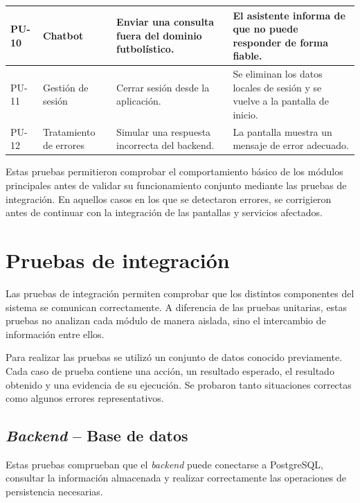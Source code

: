 \begin{table}[H]
\begin{tabular}{|l|p{3cm}|p{5cm}|p{4cm}|}
PU-10 & Chatbot & Enviar una consulta fuera del dominio futbolístico. & El asistente informa de que no puede responder de forma fiable. \\ \hline

PU-11 & Gestión de sesión & Cerrar sesión desde la aplicación. & Se eliminan los datos locales de sesión y se vuelve a la pantalla de inicio. \\ \hline

PU-12 & Tratamiento de errores & Simular una respuesta incorrecta del backend. & La pantalla muestra un mensaje de error adecuado. \\ \hline

\end{tabular}
\end{table}

Estas pruebas permitieron comprobar el comportamiento básico de los módulos principales antes de validar su funcionamiento conjunto mediante las pruebas de integración. En aquellos casos en los que se detectaron errores, se corrigieron antes de continuar con la integración de las pantallas y servicios afectados.

\section{Pruebas de integración}

Las pruebas de integración permiten comprobar que los distintos componentes del
sistema se comunican correctamente. A diferencia de las pruebas unitarias, estas
pruebas no analizan cada módulo de manera aislada, sino el intercambio de
información entre ellos.

Para realizar las pruebas se utilizó un conjunto de datos conocido previamente.
Cada caso de prueba contiene una acción, un resultado esperado, el resultado
obtenido y una evidencia de su ejecución. Se probaron tanto situaciones correctas
como algunos errores representativos.

\subsection{\textit{Backend} -- Base de datos}

Estas pruebas comprueban que el \textit{backend} puede conectarse a PostgreSQL,
consultar la información almacenada y realizar correctamente las operaciones de
persistencia necesarias.

